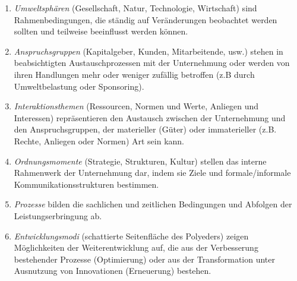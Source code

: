 \documentclass[]{article}
\providecommand{\tightlist}{%
  \setlength{\itemsep}{0pt}\setlength{\parskip}{0pt}}
\begin{document}
\begin{enumerate}
\def\labelenumi{\arabic{enumi}.}
\tightlist
\item
  \emph{Umweltsphären} (Gesellschaft, Natur, Technologie, Wirtschaft)
  sind Rahmenbedingungen, die ständig auf Veränderungen beobachtet
  werden sollten und teilweise beeinflusst werden können.
\item
  \emph{Anspruchsgruppen} (Kapitalgeber, Kunden, Mitarbeitende, usw.)
  stehen in beabsichtigten Austauschprozessen mit der Unternehmung oder
  werden von ihren Handlungen mehr oder weniger zufällig betroffen (z.B
  durch Umweltbelastung oder Sponsoring).
\item
  \emph{Interaktionsthemen} (Ressourcen, Normen und Werte, Anliegen und
  Interessen) repräsentieren den Austausch zwischen der Unternehmung und
  den Anspruchsgruppen, der materieller (Güter) oder immaterieller (z.B.
  Rechte, Anliegen oder Normen) Art sein kann.
\item
  \emph{Ordnungsmomente} (Strategie, Strukturen, Kultur) stellen das
  interne Rahmenwerk der Unternehmung dar, indem sie Ziele und
  formale/informale Kommunikationsstrukturen bestimmen.
\item
  \emph{Prozesse} bilden die sachlichen und zeitlichen Bedingungen und
  Abfolgen der Leistungserbringung ab.
\item
  \emph{Entwicklungsmodi} (schattierte Seitenfläche des Polyeders)
  zeigen Möglichkeiten der Weiterentwicklung auf, die aus der
  Verbesserung bestehender Prozesse (Optimierung) oder aus der
  Transformation unter Ausnutzung von Innovationen (Erneuerung)
  bestehen.
\end{enumerate}
\end{document}
